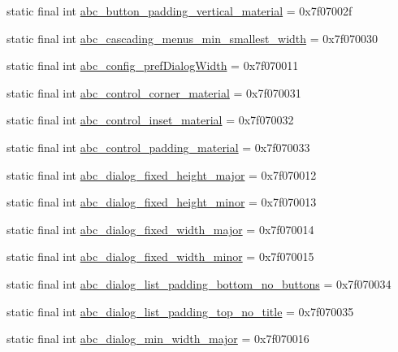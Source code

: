 \begin{CompactItemize}
\item 
static final int \hyperlink{classandroid_1_1support_1_1v4_1_1_r_1_1dimen_5820392d0da7c7d5d5a0ab620be2abaf}{abc\_\-button\_\-padding\_\-vertical\_\-material} = 0x7f07002f
\item 
static final int \hyperlink{classandroid_1_1support_1_1v4_1_1_r_1_1dimen_3c17b9eda06b5a4a9bcd35239a2545ec}{abc\_\-cascading\_\-menus\_\-min\_\-smallest\_\-width} = 0x7f070030
\item 
static final int \hyperlink{classandroid_1_1support_1_1v4_1_1_r_1_1dimen_e6ad2ffb3299a657763dd566420b3436}{abc\_\-config\_\-prefDialogWidth} = 0x7f070011
\item 
static final int \hyperlink{classandroid_1_1support_1_1v4_1_1_r_1_1dimen_f3031f90a04c165e995299a0d1b18f1d}{abc\_\-control\_\-corner\_\-material} = 0x7f070031
\item 
static final int \hyperlink{classandroid_1_1support_1_1v4_1_1_r_1_1dimen_12b1fa9c88a0371a91912d053cb867a8}{abc\_\-control\_\-inset\_\-material} = 0x7f070032
\item 
static final int \hyperlink{classandroid_1_1support_1_1v4_1_1_r_1_1dimen_a56ec7a752c4f57051afe57160987bc8}{abc\_\-control\_\-padding\_\-material} = 0x7f070033
\item 
static final int \hyperlink{classandroid_1_1support_1_1v4_1_1_r_1_1dimen_c8a8bdbae3905e2f0187378a677e8da7}{abc\_\-dialog\_\-fixed\_\-height\_\-major} = 0x7f070012
\item 
static final int \hyperlink{classandroid_1_1support_1_1v4_1_1_r_1_1dimen_e3fb1ee07b158e077737abc1ccb8c783}{abc\_\-dialog\_\-fixed\_\-height\_\-minor} = 0x7f070013
\item 
static final int \hyperlink{classandroid_1_1support_1_1v4_1_1_r_1_1dimen_8b149ea2f66282f1ae58282ac022dcd1}{abc\_\-dialog\_\-fixed\_\-width\_\-major} = 0x7f070014
\item 
static final int \hyperlink{classandroid_1_1support_1_1v4_1_1_r_1_1dimen_c10903ceae0f6cfd2577e1cf50c2bd81}{abc\_\-dialog\_\-fixed\_\-width\_\-minor} = 0x7f070015
\item 
static final int \hyperlink{classandroid_1_1support_1_1v4_1_1_r_1_1dimen_83b5951089e4fa98edba71b584415e39}{abc\_\-dialog\_\-list\_\-padding\_\-bottom\_\-no\_\-buttons} = 0x7f070034
\item 
static final int \hyperlink{classandroid_1_1support_1_1v4_1_1_r_1_1dimen_61d819f693e981d86b3264bb8e5275b6}{abc\_\-dialog\_\-list\_\-padding\_\-top\_\-no\_\-title} = 0x7f070035
\item 
static final int \hyperlink{classandroid_1_1support_1_1v4_1_1_r_1_1dimen_f76f9aa11e38e1b90fc285c3ce11ddc0}{abc\_\-dialog\_\-min\_\-width\_\-major} = 0x7f070016

\end{CompactItemize}
